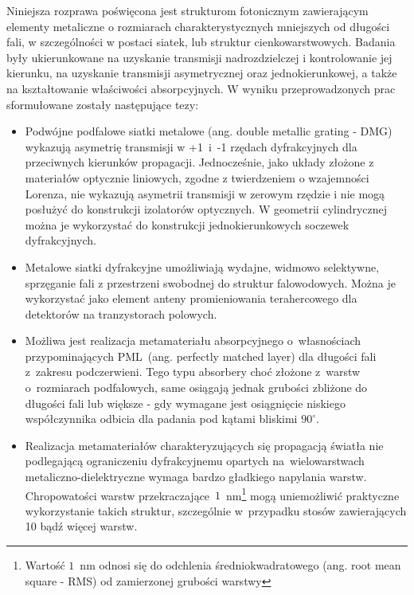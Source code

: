 Niniejsza rozprawa poświęcona jest strukturom fotonicznym zawierającym elementy metaliczne o rozmiarach charakterystycznych mniejszych od długości fali, w szczególności w postaci siatek, lub struktur cienkowarstwowych. Badania były ukierunkowane na uzyskanie  transmisji nadrozdzielczej i kontrolowanie jej kierunku, na uzyskanie transmisji asymetrycznej oraz jednokierunkowej, a także na kształtowanie właściwości absorpcyjnych. W wyniku przeprowadzonych prac sformułowane zostały następujące tezy:

\begin{itemize}
\item Podwójne podfalowe siatki metalowe (ang. double metallic grating - DMG) wykazują asymetrię transmisji w +1~i~-1 rzędach dyfrakcyjnych dla przeciwnych kierunków propagacji. Jednocześnie, jako układy złożone z materiałów optycznie liniowych, zgodne z twierdzeniem o wzajemności Lorenza, nie wykazują asymetrii transmisji w zerowym rzędzie i nie mogą posłużyć do konstrukcji izolatorów optycznych. W geometrii cylindrycznej można je wykorzystać do konstrukcji jednokierunkowych soczewek dyfrakcyjnych.

\item Metalowe siatki dyfrakcyjne umożliwiają wydajne, widmowo selektywne, sprzęganie fali z przestrzeni swobodnej do struktur falowodowych. Można je wykorzystać jako element anteny promieniowania terahercowego dla detektorów na tranzystorach polowych.

\item Możliwa jest realizacja metamateriału absorpcyjnego o~własnościach przypominających PML~(ang. perfectly matched layer) dla długości fali z~zakresu podczerwieni. Tego typu absorbery choć złożone z~warstw o~rozmiarach podfalowych, same osiągają jednak grubości zbliżone do długości fali lub większe - gdy wymagane jest osiągnięcie niskiego współczynnika odbicia dla padania pod kątami bliskimi $90^{\circ}$.

\item Realizacja metamateriałów charakteryzujących się propagacją światła nie podlegającą ograniczeniu dyfrakcyjnemu opartych na~wielowarstwach metaliczno-dielektryczne wymaga bardzo gładkiego napylania warstw. Chropowatości warstw przekraczające~$1$~nm\footnote{Wartość $1$~nm odnosi się do odchlenia średniokwadratowego (ang. root mean square - RMS) od zamierzonej grubości warstwy} mogą uniemożliwić praktyczne wykorzystanie takich struktur, szczególnie w~przypadku stosów zawierających 10 bądź więcej warstw.
\end{itemize}
